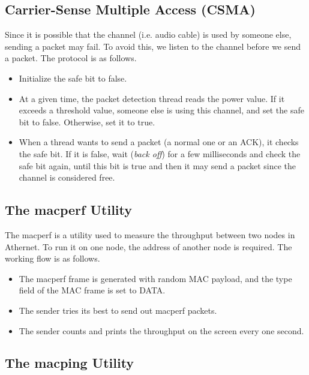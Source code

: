\documentclass[11pt, conference]{IEEEtran}
\begin{document}
\subsection{Carrier-Sense Multiple Access (CSMA)}

Since it is possible that the channel (i.e. audio cable) is used by someone else, sending a packet may fail. To avoid this, we listen to the channel before we send a packet. The protocol is as follows.
\begin{itemize}
\item Initialize the safe bit to false.
\item At a given time, the packet detection thread reads the \textsf{power} value. If it exceeds a threshold value, someone else is using this channel, and set the safe bit to false. Otherwise, set it to true.
\item When a thread wants to send a packet (a normal one or an ACK), it checks the safe bit. If it is false, wait (\emph{back off}) for a few milliseconds and check the safe bit again, until this bit is true and then it may send a packet since the channel is considered free.
\end{itemize}

\subsection{The \textsf{macperf} Utility}

The \textsf{macperf} is a utility used to measure the throughput between two nodes in Athernet. To run it on one node, the address of another node is required. The working flow is as follows.
\begin{itemize}
\item The \textsf{macperf} frame is generated with random MAC payload, and the type field of the MAC frame is set to \textsf{DATA}.
\item The sender tries its best to send out \textsf{macperf} packets.
\item The sender counts and prints the throughput on the screen every one second.
\end{itemize}

\subsection{The \textsf{macping} Utility}
\end{document}
